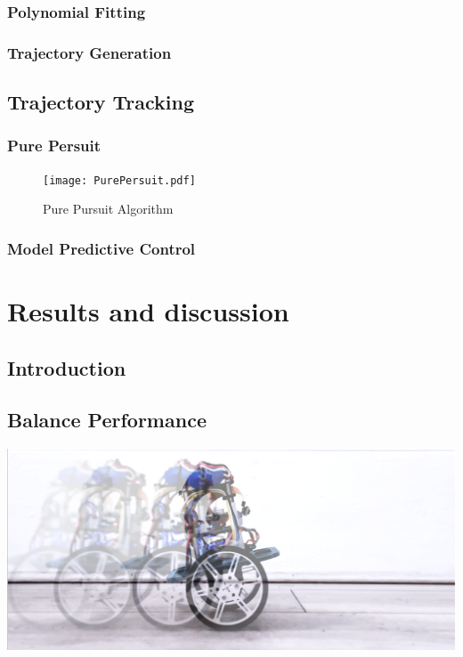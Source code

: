             \subsubsection{Polynomial Fitting}
            \subsubsection{Trajectory Generation}

    \subsection{Trajectory Tracking}
        \subsubsection{Pure Persuit}
        \begin{figure}
            \texttt{[image: PurePersuit.pdf]}
            \caption{Pure Pursuit Algorithm}
        \end{figure}
        \subsubsection{Model Predictive Control}


  \section{Results and discussion} %
    \subsection{Introduction}
    \subsection{Balance Performance}
    \includegraphics[width=\textwidth]{V1Colated.png}
